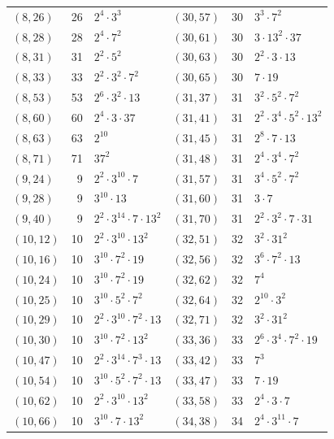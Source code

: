 \documentclass[11pt]{article}
\begin{document}
\begin{longtable}{@{}lrl@{\qquad}lrl@{}}
$(8,26)$ & 26 & $2^{4}\cdot 3^{3}$ & $(30,57)$ & 30 & $3^{3}\cdot 7^{2}$\\
$(8,28)$ & 28 & $2^{4}\cdot 7^{2}$ & $(30,61)$ & 30 & $3\cdot 13^{2}\cdot 37$\\
$(8,31)$ & 31 & $2^{2}\cdot 5^{2}$ & $(30,63)$ & 30 & $2^{2}\cdot 3\cdot 13$\\
$(8,33)$ & 33 & $2^{2}\cdot 3^{2}\cdot 7^{2}$ & $(30,65)$ & 30 & $7\cdot 19$\\
$(8,53)$ & 53 & $2^{6}\cdot 3^{2}\cdot 13$ & $(31,37)$ & 31 & $3^{2}\cdot 5^{2}\cdot 7^{2}$\\
$(8,60)$ & 60 & $2^{4}\cdot 3\cdot 37$ & $(31,41)$ & 31 & $2^{2}\cdot 3^{4}\cdot 5^{2}\cdot 13^{2}$\\
$(8,63)$ & 63 & $2^{10}$ & $(31,45)$ & 31 & $2^{8}\cdot 7\cdot 13$\\
$(8,71)$ & 71 & $37^{2}$ & $(31,48)$ & 31 & $2^{4}\cdot 3^{4}\cdot 7^{2}$\\
$(9,24)$ & 9 & $2^{2}\cdot 3^{10}\cdot 7$ & $(31,57)$ & 31 & $3^{4}\cdot 5^{2}\cdot 7^{2}$\\
$(9,28)$ & 9 & $3^{10}\cdot 13$ & $(31,60)$ & 31 & $3\cdot 7$\\
$(9,40)$ & 9 & $2^{2}\cdot 3^{14}\cdot 7\cdot 13^{2}$ & $(31,70)$ & 31 & $2^{2}\cdot 3^{2}\cdot 7\cdot 31$\\
$(10,12)$ & 10 & $2^{2}\cdot 3^{10}\cdot 13^{2}$ & $(32,51)$ & 32 & $3^{2}\cdot 31^{2}$\\
$(10,16)$ & 10 & $3^{10}\cdot 7^{2}\cdot 19$ & $(32,56)$ & 32 & $3^{6}\cdot 7^{2}\cdot 13$\\
$(10,24)$ & 10 & $3^{10}\cdot 7^{2}\cdot 19$ & $(32,62)$ & 32 & $7^{4}$\\
$(10,25)$ & 10 & $3^{10}\cdot 5^{2}\cdot 7^{2}$ & $(32,64)$ & 32 & $2^{10}\cdot 3^{2}$\\
$(10,29)$ & 10 & $2^{2}\cdot 3^{10}\cdot 7^{2}\cdot 13$ & $(32,71)$ & 32 & $3^{2}\cdot 31^{2}$\\
$(10,30)$ & 10 & $3^{10}\cdot 7^{2}\cdot 13^{2}$ & $(33,36)$ & 33 & $2^{6}\cdot 3^{4}\cdot 7^{2}\cdot 19$\\
$(10,47)$ & 10 & $2^{2}\cdot 3^{14}\cdot 7^{3}\cdot 13$ & $(33,42)$ & 33 & $7^{3}$\\
$(10,54)$ & 10 & $3^{10}\cdot 5^{2}\cdot 7^{2}\cdot 13$ & $(33,47)$ & 33 & $7\cdot 19$\\
$(10,62)$ & 10 & $2^{2}\cdot 3^{10}\cdot 13^{2}$ & $(33,58)$ & 33 & $2^{4}\cdot 3\cdot 7$\\
$(10,66)$ & 10 & $3^{10}\cdot 7\cdot 13^{2}$ & $(34,38)$ & 34 & $2^{4}\cdot 3^{11}\cdot 7$\\

\end{longtable}
\end{document}
